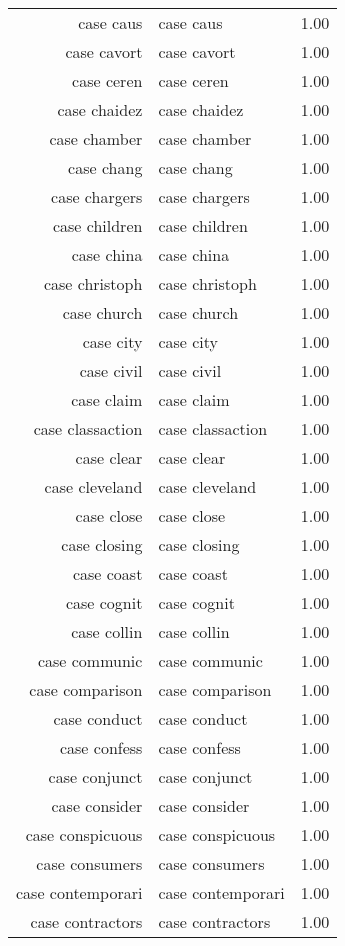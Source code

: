 \begin{table}[ht]
\begin{tabular}{rlr}
  case caus & case caus & 1.00 \\ 
  case cavort & case cavort & 1.00 \\ 
  case ceren & case ceren & 1.00 \\ 
  case chaidez & case chaidez & 1.00 \\ 
  case chamber & case chamber & 1.00 \\ 
  case chang & case chang & 1.00 \\ 
  case chargers & case chargers & 1.00 \\ 
  case children & case children & 1.00 \\ 
  case china & case china & 1.00 \\ 
  case christoph & case christoph & 1.00 \\ 
  case church & case church & 1.00 \\ 
  case city & case city & 1.00 \\ 
  case civil & case civil & 1.00 \\ 
  case claim & case claim & 1.00 \\ 
  case classaction & case classaction & 1.00 \\ 
  case clear & case clear & 1.00 \\ 
  case cleveland & case cleveland & 1.00 \\ 
  case close & case close & 1.00 \\ 
  case closing & case closing & 1.00 \\ 
  case coast & case coast & 1.00 \\ 
  case cognit & case cognit & 1.00 \\ 
  case collin & case collin & 1.00 \\ 
  case communic & case communic & 1.00 \\ 
  case comparison & case comparison & 1.00 \\ 
  case conduct & case conduct & 1.00 \\ 
  case confess & case confess & 1.00 \\ 
  case conjunct & case conjunct & 1.00 \\ 
  case consider & case consider & 1.00 \\ 
  case conspicuous & case conspicuous & 1.00 \\ 
  case consumers & case consumers & 1.00 \\ 
  case contemporari & case contemporari & 1.00 \\ 
  case contractors & case contractors & 1.00 \\ 

\end{tabular}
\end{table}

